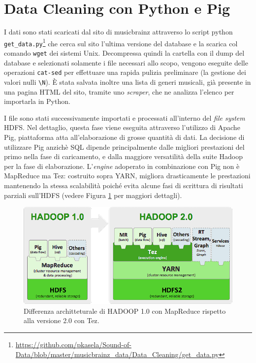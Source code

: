 \documentclass[12pt, a4paper, twocolumn]{article} %
\begin{document}
\section{Data Cleaning con Python e Pig}
I dati sono stati scaricati dal sito di musicbrainz attraverso lo script python \verb|get_data.py|\footnote{\url{https://github.com/pkasela/Sound-of-Data/blob/master/musicbrainz_data/Data_Cleaning/get_data.py}} che cerca sul sito l'ultima versione del database e la scarica col comando \verb|wget| dei sistemi Unix.
Decompressa quindi la cartella con il dump del database e selezionati solamente i file necessari allo scopo, vengono eseguite delle operazioni \verb|cat-sed| per effettuare una rapida pulizia preliminare (la gestione dei valori nulli \verb|\N|).
È stata salvata inoltre una lista di generi musicali, già presente in una pagina HTML del sito, tramite uno \textit{scraper}, che ne analizza l'elenco per importarla in Python.


I file sono stati successivamente importati e processati all'interno del \textit{file system} HDFS.
Nel dettaglio, questa fase viene eseguita attraverso l'utilizzo di Apache Pig, piattaforma atta all'elaborazione di grosse quantità di dati.
La decisione di utilizzare Pig anzichè SQL dipende principalmente dalle migliori prestazioni del primo nella fase di caricamento, e dalla maggiore versatilità della suite Hadoop per la fase di elaborazione.
L'\textit{engine} adoperato in combinazione con Pig non è MapReduce ma Tez: costruito sopra YARN\cite{apacheTez}, migliora drasticamente le prestazioni mantenendo la stessa scalabilità poiché evita alcune fasi di scrittura di risultati parziali sull'HDFS (vedere Figura \ref{fig:Hadoop} per maggiori dettagli\cite{tez}).

\begin{figure}
  \centering
  \includegraphics[width=\linewidth]{hadoop2.png}
  \caption{Differenza architteturale di HADOOP 1.0 con MapReduce rispetto alla versione 2.0 con Tez.}
  \label{fig:Hadoop}
\end{figure}
\end{document}
